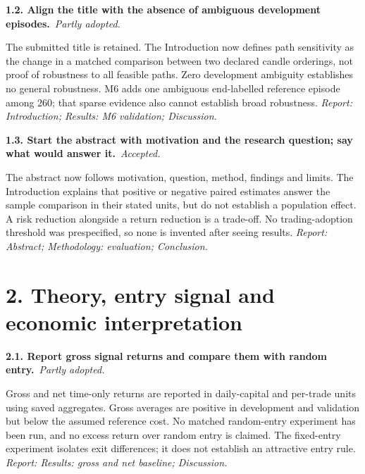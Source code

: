 \documentclass[11pt,a4paper]{article}
\newcommand{\Needspace}[1]{\par\begingroup\ifdim\dimexpr\pagegoal-\pagetotal\relax<#1\relax\newpage\fi\endgroup}
\newcommand{\reply}[3]{\par\addvspace{5pt}\noindent\textbf{#1. #2}\ \textit{#3.}\par\nobreak}
\begin{document}
\par\noindent\begin{minipage}{\linewidth}\justifying
\reply{1.2}{Align the title with the absence of ambiguous development episodes.}{Partly adopted}
The submitted title is retained. The Introduction now defines path sensitivity as the change in a matched comparison between two declared candle orderings, not proof of robustness to all feasible paths. Zero development ambiguity establishes no general robustness. M6 adds one ambiguous end-labelled reference episode among 260; that sparse evidence also cannot establish broad robustness.
{\small\textit{Report: Introduction; Results: M6 validation; Discussion.}}
\end{minipage}\par\addvspace{5pt}

\par\noindent\begin{minipage}{\linewidth}\justifying
\reply{1.3}{Start the abstract with motivation and the research question; say what would answer it.}{Accepted}
The abstract now follows motivation, question, method, findings and limits. The Introduction explains that positive or negative paired estimates answer the sample comparison in their stated units, but do not establish a population effect. A risk reduction alongside a return reduction is a trade-off. No trading-adoption threshold was prespecified, so none is invented after seeing results.
{\small\textit{Report: Abstract; Methodology: evaluation; Conclusion.}}
\end{minipage}\par\addvspace{5pt}

\Needspace{10\baselineskip}
\section*{2. Theory, entry signal and economic interpretation}
\par\noindent\begin{minipage}{\linewidth}\justifying
\reply{2.1}{Report gross signal returns and compare them with random entry.}{Partly adopted}
Gross and net time-only returns are reported in daily-capital and per-trade units using saved aggregates. Gross averages are positive in development and validation but below the assumed reference cost. No matched random-entry experiment has been run, and no excess return over random entry is claimed. The fixed-entry experiment isolates exit differences; it does not establish an attractive entry rule.
{\small\textit{Report: Results: gross and net baseline; Discussion.}}
\end{minipage}\par\addvspace{5pt}
\end{document}
